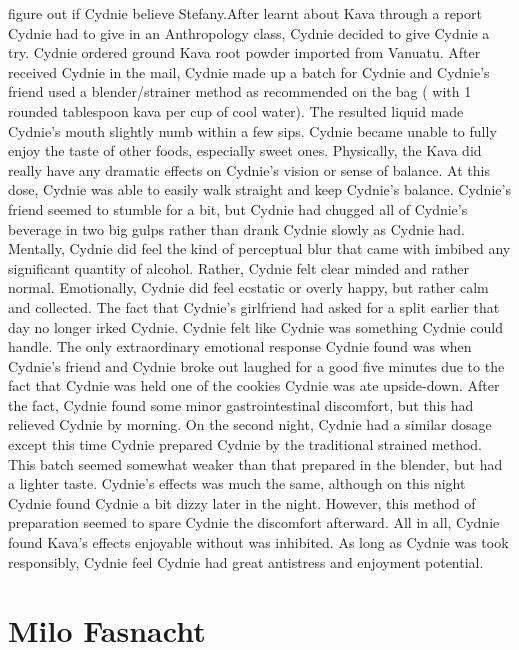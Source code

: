 \documentclass[12pt]{book}
\begin{document}
figure out if Cydnie believe Stefany.After learnt about Kava through a report Cydnie had to give in an Anthropology class, Cydnie decided to give Cydnie a try. Cydnie ordered ground Kava root powder imported from Vanuatu. After received Cydnie in the mail, Cydnie made up a batch for Cydnie and Cydnie's friend used a blender/strainer method as recommended on the bag ( with 1 rounded tablespoon kava per cup of cool water). The resulted liquid made Cydnie's mouth slightly numb within a few sips. Cydnie became unable to fully enjoy the taste of other foods, especially sweet ones. Physically, the Kava did really have any dramatic effects on Cydnie's vision or sense of balance. At this dose, Cydnie was able to easily walk straight and keep Cydnie's balance. Cydnie's friend seemed to stumble for a bit, but Cydnie had chugged all of Cydnie's beverage in two big gulps rather than drank Cydnie slowly as Cydnie had. Mentally, Cydnie did feel the kind of perceptual blur that came with imbibed any significant quantity of alcohol. Rather, Cydnie felt clear minded and rather normal. Emotionally, Cydnie did feel ecstatic or overly happy, but rather calm and collected. The fact that Cydnie's girlfriend had asked for a split earlier that day no longer irked Cydnie. Cydnie felt like Cydnie was something Cydnie could handle. The only extraordinary emotional response Cydnie found was when Cydnie's friend and Cydnie broke out laughed for a good five minutes due to the fact that Cydnie was held one of the cookies Cydnie was ate upside-down. After the fact, Cydnie found some minor gastrointestinal discomfort, but this had relieved Cydnie by morning. On the second night, Cydnie had a similar dosage except this time Cydnie prepared Cydnie by the traditional strained method. This batch seemed somewhat weaker than that prepared in the blender, but had a lighter taste. Cydnie's effects was much the same, although on this night Cydnie found Cydnie a bit dizzy later in the night. However, this method of preparation seemed to spare Cydnie the discomfort afterward. All in all, Cydnie found Kava's effects enjoyable without was inhibited. As long as Cydnie was took responsibly, Cydnie feel Cydnie had great antistress and enjoyment potential.



\chapter{Milo Fasnacht}
\end{document}
